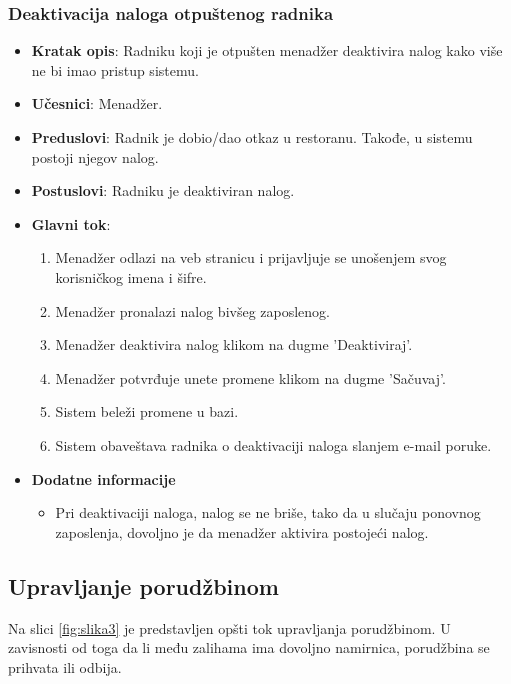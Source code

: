  \subsubsection{Deaktivacija naloga otpuštenog radnika}
 \begin{itemize}
    \item \textbf{Kratak opis}:
   Radniku koji je otpušten menadžer deaktivira nalog kako više ne bi imao pristup sistemu.
    \item \textbf{Učesnici}:
    Menadžer.
    \item \textbf{Preduslovi}:
    Radnik je dobio/dao otkaz u restoranu. Takođe, u sistemu postoji njegov nalog.
    \item \textbf{Postuslovi}:
    Radniku je deaktiviran nalog. 
    \item \textbf{Glavni tok}:
    \begin{enumerate}
        \item Menadžer odlazi na veb stranicu i prijavljuje se unošenjem svog korisničkog imena i šifre.
        \item Menadžer pronalazi nalog bivšeg zaposlenog.
        \item Menadžer deaktivira nalog klikom na dugme 'Deaktiviraj'.
        \item Menadžer potvrđuje unete promene klikom na dugme 'Sačuvaj'.
        \item Sistem beleži promene u bazi.
        \item Sistem obaveštava radnika o deaktivaciji naloga slanjem e-mail poruke.
    \end{enumerate}
\item \textbf{Dodatne informacije}
 \begin{itemize}
     \item Pri deaktivaciji naloga, nalog se ne briše, tako da u slučaju ponovnog zaposlenja, dovoljno je da menadžer aktivira postojeći nalog.
 \end{itemize}
 \end{itemize}
\newpage
\subsection{Upravljanje porudžbinom}
Na slici \ref{fig:slika3} je predstavljen opšti tok upravljanja porudžbinom. U zavisnosti od toga da li među zalihama ima dovoljno namirnica, porudžbina se prihvata ili odbija.

